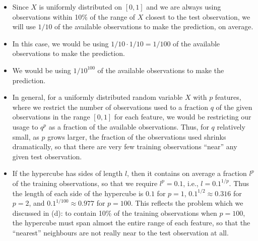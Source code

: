 \begin{itemize}
    \item[(a)] Since $X$ is uniformly distributed on $[0, 1]$ and we are always
        using observations within 10\% of the range of $X$ closest to the test
        observation, we will use $1/10$ of the available observations to make the
        prediction, on average.
    \item[(b)] In this case, we would be using $1/10 \cdot 1/10 = 1/100$ of the
        available observations to make the prediction.
    \item[(c)] We would be using $1/{10}^{100}$ of the available observations to
        make the prediction.
    \item[(d)] In general, for a uniformly distributed random variable $X$ with
        $p$ features, where we restrict the number of observations used to a
        fraction $q$ of the given observations in the range $[0, 1]$ for each
        feature, we would be restricting our usage to $q^p$ as a fraction of
        the available observations. Thus, for $q$ relatively small, as $p$ grows
        larger, the fraction of the observations used shrinks dramatically, so
        that there are very few training observations ``near'' any given test
        observation.
    \item[(e)] If the hypercube has sides of length $l$, then it contains on
        average a fraction $l^p$ of the training observations, so that we require
        $l^p = 0.1$, i.e., $l = {0.1}^{1/p}$. Thus the length of each side of the
        hypercube is $0.1$ for $p = 1$, ${0.1}^{1/2} \approx 0.316$ for $p = 2$,
        and ${0.1}^{1/100} \approx 0.977$ for $p = 100$. This reflects the problem
        which we discussed in (d): to contain 10\% of the training observations
        when $p = 100$, the hypercube must span almost the entire range of each
        feature, so that the ``nearest'' neighbours are not really near to the
        test observation at all.
\end{itemize}
